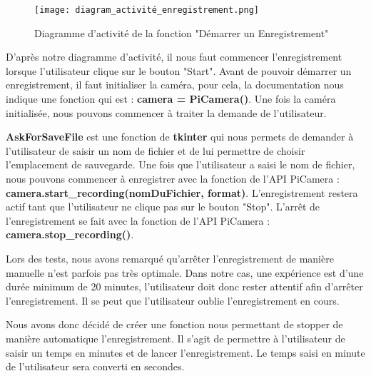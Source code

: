             \begin{figure}[ht]
                \centering
                \texttt{[image: diagram\_activité\_enregistrement.png]} 
                \caption{Diagramme d'activité de la fonction "Démarrer un Enregistrement"}
            \end{figure}

            
            D'après notre diagramme d'activité, il nous faut commencer l'enregistrement lorsque l'utilisateur clique sur le bouton "Start". Avant de pouvoir démarrer un enregistrement, il faut initialiser la caméra, pour cela, la documentation nous indique une fonction qui est : \textbf{camera = PiCamera()}. Une fois la caméra initialisée, nous pouvons commencer à traiter la demande de l'utilisateur.

            \vspace{0.2cm}
            
            \textbf{AskForSaveFile} est une fonction de \textbf{tkinter} qui nous permets de demander à l'utilisateur de saisir un nom de fichier et de lui permettre de choisir l'emplacement de sauvegarde. Une fois que l'utilisateur a saisi le nom de fichier, nous pouvons commencer à enregistrer avec la fonction de l'API PiCamera : \textbf{camera.start\_recording(nomDuFichier, format)}.
            L'enregistrement restera actif tant que l'utilisateur ne clique pas sur le bouton "Stop".
            L'arrêt de l'enregistrement se fait avec la fonction de l'API PiCamera : \textbf{camera.stop\_recording()}.

            \vspace{0.2cm}

            Lors des tests, nous avons remarqué qu'arrêter l'enregistrement de manière manuelle n'est parfois pas très optimale. Dans notre cas, une expérience est d'une durée minimum de 20 minutes, l'utilisateur doit donc rester attentif afin d'arrêter l'enregistrement. Il se peut que l'utilisateur oublie l'enregistrement en cours. 
            
            Nous avons donc décidé de créer une fonction nous permettant de stopper de manière automatique l'enregistrement. Il s'agit de permettre à l'utilisateur de saisir un temps en minutes et de lancer l'enregistrement. Le temps saisi en minute de l'utilisateur sera converti en secondes.

            \vspace{0.2cm}

